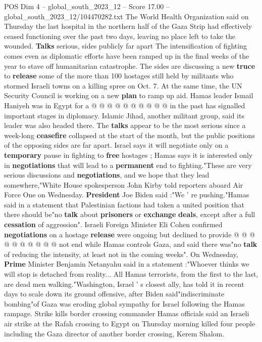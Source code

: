 \begin{textsample}{POS Dim 4 – global\_south\_2023\_12 – Score 17.00 – global\_south\_2023\_12/104470282.txt}
The World Health Organization said on Thursday the last hospital in the northern half of the Gaza Strip had effectively ceased functioning over the past two days, leaving no place left to take the wounded. \textbf{Talks} serious, sides publicly far apart The intensification of fighting comes even as diplomatic efforts have been ramped up in the final weeks of the year to stave off humanitarian catastrophe.
The sides are discussing a new \textbf{truce} to \textbf{release} some of the more than 100 hostages still held by militants who stormed Israeli towns on a killing spree on Oct. 7.
At the same time, the UN Security Council is working on a new \textbf{plan} to ramp up aid.
Hamas leader Ismail Haniyeh was in Egypt for a @ @ @ @ @ @ @ @ @ @ in the past has signalled important stages in diplomacy.
Islamic Jihad, another militant group, said its leader was also headed there.
The \textbf{talks} appear to be the most serious since a week-long \textbf{ceasefire} collapsed at the start of the month, but the public positions of the opposing sides are far apart.
Israel says it will negotiate only on a \textbf{temporary} pause in fighting to \textbf{free} hostages ; Hamas says it is interested only in \textbf{negotiations} that will lead to a \textbf{permanent} end to fighting."These are very serious discussions and \textbf{negotiations}, and we hope that they lead somewhere,"White House spokesperson John Kirby told reporters aboard Air Force One on Wednesday. \textbf{President} Joe Biden said :"We ' re pushing."Hamas said in a statement that Palestinian factions had taken a united position that there should be"no \textbf{talk} about \textbf{prisoners} or \textbf{exchange} \textbf{deals}, except after a full \textbf{cessation} of aggression".
Israeli Foreign Minister Eli Cohen confirmed \textbf{negotiations} on a hostage \textbf{release} were ongoing but declined to provide @ @ @ @ @ @ @ @ @ @ not end while Hamas controls Gaza, and said there was"no \textbf{talk} of reducing the intensity, at least not in the coming weeks".
On Wednesday, \textbf{Prime} Minister Benjamin Netanyahu said in a statement :"Whoever thinks we will stop is detached from reality...
All Hamas terrorists, from the first to the last, are dead men walking."Washington, Israel ' s closest ally, has told it in recent days to scale down its ground offensive, after Biden said"indiscriminate bombing"of Gaza was eroding global sympathy for Israel following the Hamas rampage.
Strike kills border crossing commander Hamas officials said an Israeli air strike at the Rafah crossing to Egypt on Thursday morning killed four people including the Gaza director of another border crossing, Kerem Shalom.

\end{textsample}
